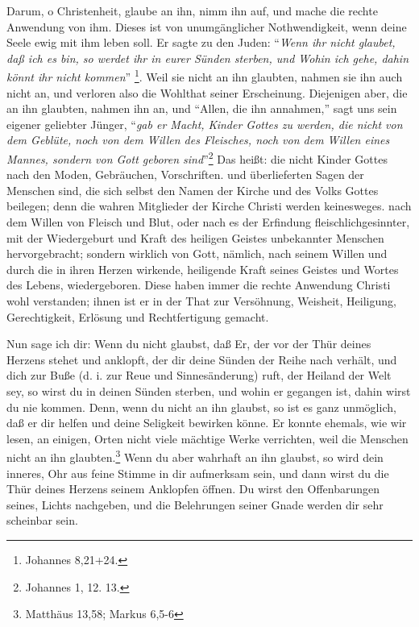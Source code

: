 Darum, o Christenheit, glaube an ihn, nimm ihn auf, und mache die rechte
Anwendung von ihm. Dieses ist von unumgänglicher Nothwendigkeit, wenn deine
Seele ewig mit ihm leben soll.
Er sagte zu den Juden: "`\textit{Wenn ihr nicht glaubet,
daß ich es bin, so werdet ihr in eurer Sünden sterben, und Wohin ich gehe, dahin
könnt ihr nicht kommen}"' \footnote{Johannes 8,21+24.}.
 Weil sie nicht an ihn 
glaubten, nahmen sie ihn auch nicht an, und verloren also die Wohlthat seiner
Erscheinung. Diejenigen aber, die an ihn glaubten, nahmen ihn an, und "`Allen,
die ihn annahmen,"' sagt uns sein eigener geliebter Jünger, "`\textit{gab er Macht,
Kinder Gottes zu werden, die nicht von dem Geblüte, noch von dem Willen des
Fleisches, noch von dem Willen eines Mannes, sondern von Gott geboren
sind}"'\footnote{Johannes 1, 12. 13.} 
Das heißt: die nicht Kinder Gottes nach den
Moden, Gebräuchen, Vorschriften. und überlieferten Sagen der Menschen sind, die
sich selbst den Namen der Kirche und des Volks Gottes beilegen; denn die wahren
Mitglieder der Kirche Christi werden keinesweges. nach dem Willen von Fleisch
und Blut, oder nach es der Erfindung fleischlichgesinnter, mit der Wiedergeburt
und Kraft des heiligen Geistes unbekannter Menschen hervorgebracht; sondern
wirklich von Gott, nämlich, nach seinem Willen und  durch die in ihren Herzen
wirkende, heiligende Kraft seines Geistes und Wortes des Lebens, wiedergeboren.
Diese haben immer die rechte Anwendung Christi wohl verstanden; ihnen ist er in
der That zur Versöhnung, Weisheit, Heiligung, Gerechtigkeit, Erlösung und
Rechtfertigung gemacht.

Nun sage ich dir: Wenn du nicht glaubst, daß Er, der vor der Thür deines Herzens
stehet und anklopft, der dir deine Sünden der Reihe nach verhält, und dich zur
Buße (d. i. zur Reue und Sinnesänderung) ruft, der Heiland der Welt sey, so
wirst du in deinen Sünden sterben, und wohin er gegangen ist, dahin wirst du nie
kommen. Denn, wenn du nicht an ihn glaubst, so ist es ganz unmöglich, daß er dir
helfen und deine Seligkeit bewirken könne. Er konnte ehemals, wie wir lesen, an
einigen, Orten nicht viele mächtige Werke verrichten, weil die Menschen nicht an
ihn glaubten.\footnote{Matthäus 13,58; Markus 6,5-6}
 
Wenn du aber wahrhaft an ihn
glaubst, so wird dein inneres, Ohr aus feine Stimme in dir aufmerksam sein, und
dann wirst du die Thür deines Herzens seinem Anklopfen öffnen. Du wirst den
Offenbarungen seines, Lichts nachgeben, und die Belehrungen seiner Gnade werden
dir sehr scheinbar sein.


